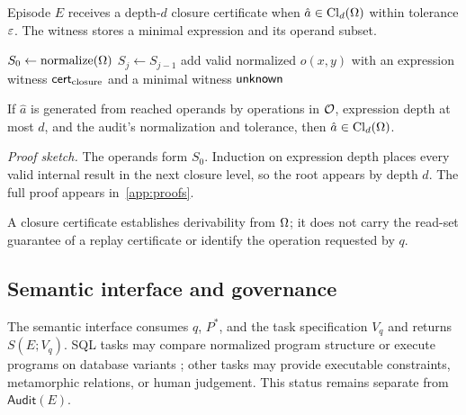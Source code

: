 \begin{definition}
\label{def:closure}
Episode $E$ receives a depth-$d$ closure certificate when
$\hat a\in\operatorname{Cl}_d(\Omega)$ within tolerance $\varepsilon$. The witness stores a
minimal expression and its operand subset.
\end{definition}

\begin{algorithm}[!t]
\caption{Bounded operand closure}
\label{alg:closure}
\begin{algorithmic}[1]
\State $S_0\gets\operatorname{normalize}(\Omega)$
  \State $S_j\gets S_{j-1}$
    \State add valid normalized $o(x,y)$ with an expression witness
  \EndFor
\EndFor
{}
  \State \Return $\mathsf{cert}_{\mathrm{closure}}$ and a minimal witness
\EndIf
\State \Return $\mathsf{unknown}$
\EndFunction
\end{algorithmic}
\end{algorithm}

\begin{proposition}
\label{prop:complete}
If $\hat a$ is generated from reached operands by operations in $\mathcal{O}$,
expression depth at most $d$, and the audit's normalization and tolerance,
then $\hat a\in\operatorname{Cl}_d(\Omega)$.
\end{proposition}

\noindent\emph{Proof sketch.}
The operands form $S_0$. Induction on expression depth places every valid
internal result in the next closure level, so the root appears by depth $d$.
The full proof appears in~\ref{app:proofs}.

A closure certificate establishes derivability from $\Omega$; it does not
carry the read-set guarantee of a replay certificate or identify the operation
requested by $q$.

\subsection{Semantic interface and governance}
\label{sec:semanticinterface}

The semantic interface consumes $q$, $P^*$, and the task specification $V_q$
and returns $S(E;V_q)$. SQL tasks may compare normalized program structure or
execute programs on database variants \citep{zhong2020testsuite}; other tasks
may provide executable constraints, metamorphic relations, or human judgement.
This status remains separate from $\mathsf{Audit}(E)$.

